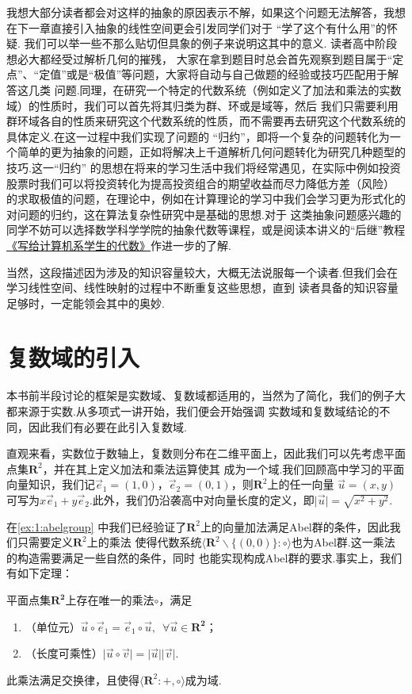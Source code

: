 我想大部分读者都会对这样的抽象的原因表示不解，如果这个问题无法解答，我想在下一章直接引入抽象的线性空间更会引发同学们对于
``学了这个有什么用''的怀疑. 我们可以举一些不那么贴切但具象的例子来说明这其中的意义. 读者高中阶段想必大都经受过解析几何的摧残，
大家在拿到题目时总会首先观察到题目属于``定点''、``定值''或是``极值''等问题，大家将自动与自己做题的经验或技巧匹配用于解答这几类
问题.同理，在研究一个特定的代数系统（例如定义了加法和乘法的实数域）的性质时，我们可以首先将其归类为群、环或是域等，然后
我们只需要利用群环域各自的性质来研究这个代数系统的性质，而不需要再去研究这个代数系统的具体定义.在这一过程中我们实现了问题的
``归约''，即将一个复杂的问题转化为一个简单的更为抽象的问题，正如将解决上千道解析几何问题转化为研究几种题型的技巧.这一``归约''
的思想在将来的学习生活中我们将经常遇见，在实际中例如投资股票时我们可以将投资转化为提高投资组合的期望收益而尽力降低方差（风险）
的求取极值的问题，在理论中，例如在计算理论的学习中我们会学习更为形式化的对问题的归约，这在算法复杂性研究中是基础的思想.对于
这类抽象问题感兴趣的同学不妨可以选择数学科学学院的抽象代数等课程，或是阅读本讲义的``后继''教程
\href{https://frightenedfoxcn.github.io/notes/series/alg-for-cs/}{《写给计算机系学生的代数》}作进一步的了解.

当然，这段描述因为涉及的知识容量较大，大概无法说服每一个读者.但我们会在学习线性空间、线性映射的过程中不断重复这些思想，直到
读者具备的知识容量足够时，一定能领会其中的奥妙.

\section{复数域的引入}
本书前半段讨论的框架是实数域、复数域都适用的，当然为了简化，我们的例子大都来源于实数.从多项式一讲开始，我们便会开始强调
实数域和复数域结论的不同，因此我们有必要在此引入复数域.

直观来看，实数位于数轴上，复数则分布在二维平面上，因此我们可以先考虑平面点集$\mathbf{R}^2$，并在其上定义加法和乘法运算使其
成为一个域.我们回顾高中学习的平面向量知识，我们记$\vec{e}_1=(1,0)$，$\vec{e}_2=(0,1)$，则$\mathbf{R}^2$上的任一向量
$\vec{u}=(x,y)$可写为$x\vec{e}_1+y\vec{e}_2$.此外，我们仍沿袭高中对向量长度的定义，即$\lvert\vec{u}\rvert=\sqrt{x^2+y^2}$.

在\autoref{ex:1:abelgroup} 中我们已经验证了$\mathbf{R}^2$上的向量加法满足Abel群的条件，因此我们只需要定义$\mathbf{R}^2$上的乘法
使得代数系统$\langle\mathbf{R}^2\backslash\{(0,0)\}:\circ\rangle$也为Abel群.这一乘法的构造需要满足一些自然的条件，同时
也能实现构成Abel群的要求.事实上，我们有如下定理：
\begin{theorem}\label{th:1:complexmult}
    平面点集$\mathbf{R^2}$上存在唯一的乘法$\circ$，满足
    \begin{enumerate}
        \item（单位元）$\vec{u}\circ\vec{e}_1=\vec{e}_1\circ\vec{u},\enspace\forall\vec{u}\in\mathbf{R^2}$；

        \item（长度可乘性）$\lvert\vec{u}\circ\vec{v}\rvert=\lvert\vec{u}\rvert\lvert\vec{v}\rvert$.
    \end{enumerate}

    此乘法满足交换律，且使得$\langle\mathbf{R}^2:+,\circ\rangle$成为域.
\end{theorem}

